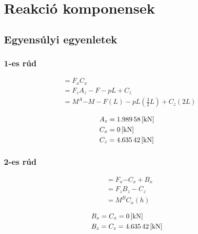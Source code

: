 \section{Reakció komponensek}

\wholestructure

\subsection{Egyensúlyi egyenletek}

\subsubsection{1-es rúd}

\sztaone

\begin{align*}
	&\equal{F_x}{C_x} \\
	&\equal{F_z}{A_z - F - pL + C_z} \\
	&\equal{M^A}{-M-F(L)-pL\left(\frac{3}{2}L\right)+C_z(2L)}
\end{align*}

\begin{align*}
	&A_z = \SI{1.98958}{[\kilo\newton]} \\
	&C_x = \SI{0}{[\kilo\newton]} \\
	&C_z = \SI{4.63542}{[\kilo\newton]} 
\end{align*}

\subsubsection{2-es rúd}

\sztatwo

\begin{align*}
	&\equal{F_x}{-C_x+B_x} \\
	&\equal{F_z}{B_z - C_z} \\
	&\equal{M^B}{C_x(h)}
\end{align*}

\begin{align*}
	&B_x = C_x = \SI{0}{[\kilo\newton]} \\
	&B_z = C_z = \SI{4.63542}{[\kilo\newton]} 
\end{align*}
